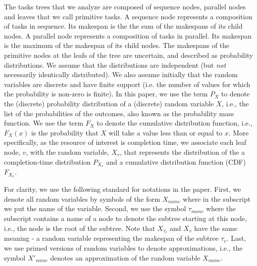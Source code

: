 \documentclass[review]{elsarticle}
\begin{document}

The tasks trees that we analyze are composed of sequence nodes, parallel nodes and leaves that we call primitive tasks. A sequence node represents a composition of tasks in sequence. Its makespan is the the sum of the makespans of its child nodes. A parallel node represents a composition of tasks in parallel. Its makespan is the maximum of the makespan of its child nodes.
The makespans of the primitive nodes at the leafs of the tree are uncertain, and described as probability distributions.
We assume  that the distributions are  independent (but {\em not} necessarily identically distributed).
We also assume initially that the random variables are discrete and have finite support (i.e. the number of values for which the probability is non-zero is finite).
In this paper, we use the term $P_X$ to denote the (discrete) probability distribution of a (discrete) random variable $X$, i.e., the list of the probabilities of the outcomes, also known as the probability mass function. We use the term $F_X$ to denote the cumulative distribution function, i.e., $F_X(x)$ is the probability that $X$ will take a value less than or equal to $x$. More specifically, as the resource of interest is completion time, we associate each leaf node, $v$, with the random variable, $X_v$, that represents the distribution of the 
a completion-time distribution $P_{X_v}$ and a cumulative distribution function (CDF) $F_{X_v}$.

For clarity, we use the following standard for notations in the paper. First, we denote all random variables by symbols of the form $X_{name}$ where in the subscript we put the name of the variable. %
Second, we use the symbol $\tau_{name}$ where the subscript contains a name of a node to denote the subtree starting at this node, i.e., the node is the root of the subtree. Note that $X_{\tau_{v}}$ and $X_v$ have the same meaning - a random variable representing the makespan of the subtree $\tau_{v}$.
Last, we use primed versions of random variables to denote approximations, i.e., the symbol $X'_{name}$ denotes an approximation of the random variable $X_{name}$.
\end{document}
